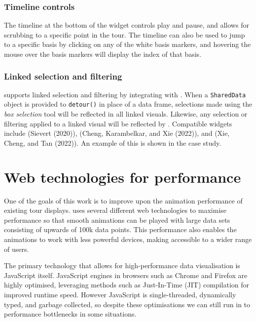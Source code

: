 \hypertarget{timeline-controls}{%
\subsubsection{Timeline controls}\label{timeline-controls}}

The timeline at the bottom of the widget controls play and pause, and allows for scrubbing to a specific point in the tour. The timeline can also be used to jump to a specific basis by clicking on any of the white basis markers, and hovering the mouse over the basis markers will display the index of that basis.

\hypertarget{linked-selection-and-filtering}{%
\subsubsection{Linked selection and filtering}\label{linked-selection-and-filtering}}

 supports linked selection and filtering by integrating with . When a  \texttt{SharedData} object is provided to \texttt{detour()} in place of a data frame, selections made using the \emph{box selection} tool will be reflected in all linked visuals. Likewise, any selection or filtering applied to a linked visual will be reflected by . Compatible widgets include  (Sievert (2020)),  (Cheng, Karambelkar, and Xie (2022)), and  (Xie, Cheng, and Tan (2022)). An example of this is shown in the case study.

\hypertarget{web-technologies-for-performance}{%
\section{Web technologies for performance}\label{web-technologies-for-performance}}

One of the goals of this work is to improve upon the animation performance of existing tour displays.  uses several different web technologies to maximise performance so that smooth animations can be played with large data sets consisting of upwards of 100k data points. This performance also enables the animations to work with less powerful devices, making  accessible to a wider range of users.

The primary technology that allows for high-performance data visualisation is JavaScript itself. JavaScript engines in browsers such as Chrome and Firefox are highly optimised, leveraging methods such as Just-In-Time (JIT) compilation for improved runtime speed. However JavaScript is single-threaded, dynamically typed, and garbage collected, so despite these optimisations we can still run in to performance bottlenecks in some situations.

